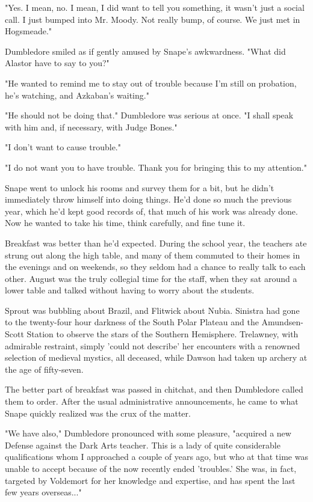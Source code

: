\documentclass[a4paper,11pt]{article}
\begin{document}
"Yes. I mean, no. I mean, I did want to tell you something, it wasn't just a social call. I just bumped into Mr. Moody. Not really bump, of course. We just met in Hogsmeade."

Dumbledore smiled as if gently amused by Snape's awkwardness. "What did Alastor have to say to you?"

"He wanted to remind me to stay out of trouble because I'm still on probation, he's watching, and Azkaban's waiting."

"He should not be doing that." Dumbledore was serious at once. "I shall speak with him and, if necessary, with Judge Bones."

"I don't want to cause trouble."

"I do not want you to have trouble. Thank you for bringing this to my attention."

Snape went to unlock his rooms and survey them for a bit, but he didn't immediately throw himself into doing things. He'd done so much the previous year, which he'd kept good records of, that much of his work was already done. Now he wanted to take his time, think carefully, and fine tune it.

Breakfast was better than he'd expected. During the school year, the teachers ate strung out along the high table, and many of them commuted to their homes in the evenings and on weekends, so they seldom had a chance to really talk to each other. August was the truly collegial time for the staff, when they sat around a lower table and talked without having to worry about the students.

Sprout was bubbling about Brazil, and Flitwick about Nubia. Sinistra had gone to the twenty-four hour darkness of the South Polar Plateau and the Amundsen-Scott Station to observe the stars of the Southern Hemisphere. Trelawney, with admirable restraint, simply 'could not describe' her encounters with a renowned selection of medieval mystics, all deceased, while Dawson had taken up archery at the age of fifty-seven.

The better part of breakfast was passed in chitchat, and then Dumbledore called them to order. After the usual administrative announcements, he came to what Snape quickly realized was the crux of the matter.

"We have also," Dumbledore pronounced with some pleasure, "acquired a new Defense against the Dark Arts teacher. This is a lady of quite considerable qualifications whom I approached a couple of years ago, but who at that time was unable to accept because of the now recently ended 'troubles.' She was, in fact, targeted by Voldemort for her knowledge and expertise, and has spent the last few years overseas..."
\end{document}
